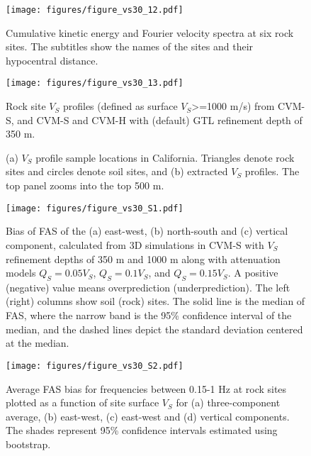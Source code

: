 \clearpage
\begin{figure}[!ht]
  \centering
  \texttt{[image: figures/figure\_vs30\_12.pdf]}
  \caption{Cumulative kinetic energy and Fourier velocity spectra at six rock sites. The subtitles show the names of the sites and their hypocentral distance.
  }
  \label{fig:vs30-12}
\end{figure}

\clearpage
\begin{figure}[!ht]
  \centering
  \texttt{[image: figures/figure\_vs30\_13.pdf]}
  \caption{Rock site $V_S$ profiles (defined as surface $V_S$>=1000 m/s) from CVM-S, and CVM-S and CVM-H with (default) \citet{elyVs30derivedNearsurfaceSeismic2010} GTL refinement depth of 350 m.}
  \label{fig:vs30-13}
\end{figure}

\clearpage
{}
\begin{figure}[!ht]
   \hfil
  \caption{ (a) $V_S$ profile sample locations in California. Triangles denote rock sites and circles denote soil sites, and (b) extracted $V_S$ profiles. The top panel zooms into the top 500 m. }
  \label{fig:vs30-14}
\end{figure}

\clearpage
\begin{figure}[!ht]
  \centering
  \texttt{[image: figures/figure\_vs30\_S1.pdf]}
  \caption{Bias of FAS of the (a) east-west, (b) north-south and (c) vertical component, calculated from 3D simulations in CVM-S with $V_S$ refinement depths of 350 m and 1000 m along with attenuation models $Q_S=0.05V_S$, $Q_S=0.1V_S$, and $Q_S=0.15V_S$. A positive (negative) value means overprediction (underprediction). The left (right) columns show soil (rock) sites. The solid line is the median of FAS, where the narrow band is the 95\% confidence interval of the median, and the dashed lines depict the standard deviation centered at the median.}
  \label{fig:vs30-S1}
\end{figure}

\clearpage
\begin{figure}[!ht]
  \centering
  \texttt{[image: figures/figure\_vs30\_S2.pdf]}
  \caption{Average FAS bias for frequencies between 0.15-1 Hz at rock sites plotted as a function of site surface $V_S$ for (a) three-component average, (b) east-west, (c) east-west and (d) vertical components. The shades represent 95\% confidence intervals estimated using bootstrap.}
  \label{fig:vs30-S2}
\end{figure}

